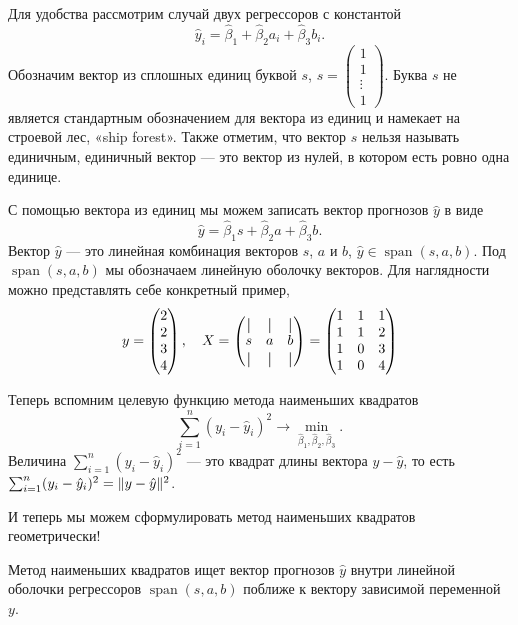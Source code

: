 \documentclass[12pt]{article}
\DeclareMathOperator{\Span}{span}
\DeclarePairedDelimiter{\norm}{\lVert}{\rVert}
\newcommand*{\vertbar}{\rule[-1ex]{0.5pt}{2.5ex}}
\newcommand{\hb}{\hat{\beta}}
\newcommand{\hy}{\hat{y}}
\newcommand{\one}{s} %
\begin{document}
Для удобства рассмотрим случай двух регрессоров с константой
\[
\hy_i = \hb_1 + \hb_2 a_i + \hb_3 b_i.
\]
Обозначим вектор из сплошных единиц буквой $\one$, $\one = \begin{pmatrix}
    1 \\
    1 \\
    \vdots \\
    1
\end{pmatrix}$.
Буква $\one$ не является стандартным обозначением для вектора из единиц 
и намекает на строевой лес, «ship forest».
Также отметим, что вектор $\one$ нельзя называть единичным, единичный вектор — это вектор из нулей, в котором есть ровно одна единице. 

С помощью вектора из единиц мы можем записать вектор прогнозов $\hy$ в виде
\[
\hy = \hb_1 \one + \hb_2 a + \hb_3 b.
\]
Вектор $\hy$ — это линейная комбинация векторов $\one$, $a$ и $b$,
$\hy \in \Span(\one, a, b)$. 
Под $\Span(s, a, b)$ мы обозначаем линейную оболочку векторов.
Для наглядности можно представлять себе конкретный пример, 
\[
y = \begin{pmatrix}
    2 \\
    2 \\
    3 \\
    4 \\
\end{pmatrix}, \quad 
X = \begin{pmatrix}
    \vertbar & \vertbar & \vertbar \\
    s & a & b \\
    \vertbar & \vertbar & \vertbar \\    
\end{pmatrix} = \begin{pmatrix}
    1 & 1 & 1 \\
    1 & 1 & 2 \\
    1 & 0 & 3 \\
    1 & 0 & 4 \\
\end{pmatrix}
\]

Теперь вспомним целевую функцию метода наименьших квадратов
\[
\sum_{i=1}^n (y_i - \hy_i)^2 \to \min_{\hb_1, \hb_2, \hb_3}.
\]
Величина $\sum_{i=1}^n (y_i - \hy_i)^2$ — это квадрат длины вектора $y - \hy$, то есть $\sum_{i=1}^n (y_i - \hy_i)^2 = \norm{y - \hy}^2$.

И теперь мы можем сформулировать метод наименьших квадратов геометрически!
\begin{explanation}
    Метод наименьших квадратов ищет вектор прогнозов $\hy$ внутри линейной оболочки регрессоров $\Span(s, a, b)$ поближе к вектору  зависимой переменной $y$.
\end{explanation}
\end{document}
